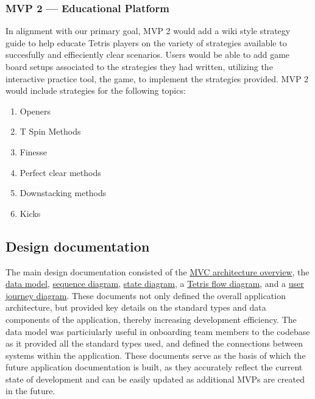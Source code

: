 \documentclass[english,course]{lecture}
\begin{document}
\subsubsection*{MVP 2 --- Educational Platform}
In alignment with our primary goal, MVP 2 would add a wiki style strategy guide to help educate Tetris players on the variety of strategies available to succesfully and effieciently clear scenarios. Users would be able to add game board setups associated to the strategies they had written, utilizing the interactive practice tool, the game, to implement the strategies provided. MVP 2 would include strategies for the following topics:
%
\begin{enumerate}
  \item Openers
  \item T Spin Methods
  \item Finesse
  \item Perfect clear methods
  \item Downstacking methods
  \item Kicks
\end{enumerate}
%
\subsection{Design documentation}
The main design documentation consisted of the \href{https://github.com/teamcrusher/threewide/blob/main/Design%20documentation/Diagrams/MVC-architecture-overview.md}{MVC architecture overview}, the \href{https://github.com/teamcrusher/threewide/blob/main/Design%20documentation/Diagrams/Data-model.md}{data model}, \href{https://github.com/teamcrusher/threewide/blob/main/Design%20documentation/Diagrams/Sequence-Diagram.md}{sequence diagram}, \href{https://github.com/teamcrusher/threewide/blob/main/Design%20documentation/Diagrams/State-diagram.md}{state diagram}, a \href{https://github.com/teamcrusher/threewide/blob/main/Design%20documentation/Diagrams/Tetris-flow.md}{Tetris flow diagram}, and a \href{https://github.com/teamcrusher/threewide/blob/main/Design%20documentation/Diagrams/User-journey-diagram.md}{user journey diagram}.
These documents not only defined the overall application architecture, but provided key details on the standard types and data components of the application, thereby increasing development efficiency. The data model was particiularly useful in onboarding team members to the codebase as it provided all the standard types used, and defined the connections between systems within the application. These documents serve as the basis of which the future application documentation is built, as they accurately reflect the current state of development and can be easily updated as additional MVPs are created in the future.
%
\end{document}
